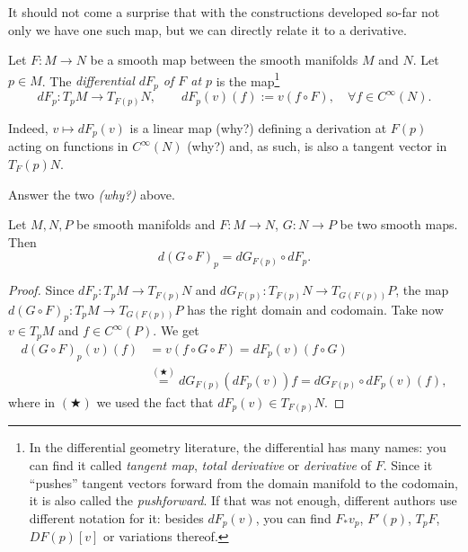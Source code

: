 It should not come a surprise that with the constructions developed so-far not only we have one such map, but we can directly relate it to a derivative.

\begin{definition}\label{def:differentialMap}
  Let $F: M \to N$ be a smooth map between the smooth manifolds $M$ and $N$.
  Let $p\in M$. The \emph{differential $d F_p$ of $F$ at $p$} is the map\footnote{In the differential geometry literature, the differential has many names: you can find it called \emph{tangent map}, \emph{total derivative} or \emph{derivative} of $F$. Since it ``pushes'' tangent vectors forward from the domain manifold to the codomain, it is also called the \emph{pushforward}. If that was not enough, different authors use different notation for it: besides $dF_p(v)$, you can find $F_* v_p$, $F'(p)$, $T_pF$, $DF(p)[v]$ or variations thereof.}
  \begin{equation}
    d F_p : T_p M \to T_{F(p)} N, \qquad d F_p (v) (f) := v(f\circ F), \quad \forall f\in C^\infty(N).
  \end{equation}  
\end{definition}

Indeed, $v \mapsto d F_p (v)$ is a linear map (why?) defining a derivation at $F(p)$ acting on functions in $C^\infty(N)$ (why?) and, as such, is also a tangent vector in $T_F(p)N$.

\begin{exercise}
  Answer the two \emph{(why?)} above.
\end{exercise}

\begin{theorem}\label{thm:chainrule_mfld}
  Let $M, N, P$ be smooth manifolds and $F: M \to N$, $G: N\to P$ be two smooth maps. Then
  \begin{equation}
    d(G\circ F)_p = dG_{F(p)} \circ dF_p.
  \end{equation}
\end{theorem}
\begin{proof}
  Since $dF_p : T_p M \to T_{F(p)}N$ and $dG_{F(p)}: T_{F(p)}N \to T_{G(F(p))}P$, the map $d(G\circ F)_p: T_p M \to T_{G(F(p))}P$ has the right domain and codomain.
  Take now $v\in T_p M$ and $f\in C^\infty(P)$. We get
  \begin{align}
    d(G\circ F)_p(v)(f) &= v(f\circ G \circ F)
    = dF_p (v)(f\circ G) \\
    &\stackrel{(\bigstar)}{=} dG_{F(p)}(dF_p (v))f 
    = dG_{F(p)} \circ dF_p (v)(f),
  \end{align}
  where in $(\bigstar)$ we used the fact that $dF_p (v)\in T_{F(p)}N$.
\end{proof}

